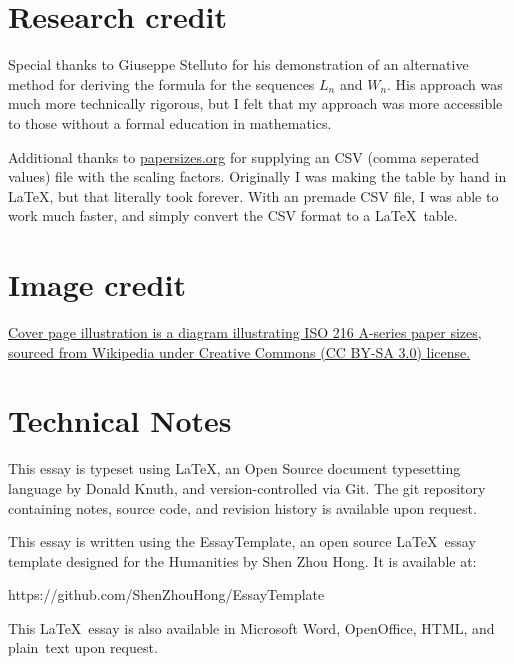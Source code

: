 
\section*{Research credit}
Special thanks to Giuseppe Stelluto for his demonstration of an alternative method for deriving the formula for the sequences $L_n$ and $W_n$. His approach was much more technically rigorous, but I felt that my approach was more accessible to those without a formal education in mathematics.

\noindent
Additional thanks to \href{https://www.papersizes.org}{papersizes.org} for supplying an CSV (comma seperated values) file with the scaling factors. Originally I was making the table by hand in LaTeX, but that literally took forever. With an premade CSV file, I was able to work much faster, and simply convert the CSV format to a \LaTeX\ table.

\section*{Image credit}
\href{https://en.wikipedia.org/wiki/File:A_size_illustration2.svg}{Cover page illustration is a diagram illustrating ISO 216 A-series paper sizes, sourced from Wikipedia under Creative Commons (CC BY-SA 3.0) license.}

\section*{Technical Notes}
This essay is typeset using \LaTeX, an Open Source document typesetting language
by Donald Knuth, and version-controlled via Git. The git repository containing notes, source code, and revision history is available upon request.


\noindent
This essay is written using the EssayTemplate, an open source \LaTeX\ essay
template designed for the Humanities by Shen Zhou Hong. It is available at:

https://github.com/ShenZhouHong/EssayTemplate

\vfill
\begin{center}
This \LaTeX\ essay is also available in Microsoft Word, OpenOffice, HTML, and \mbox{plain text} upon request.
\end{center}
